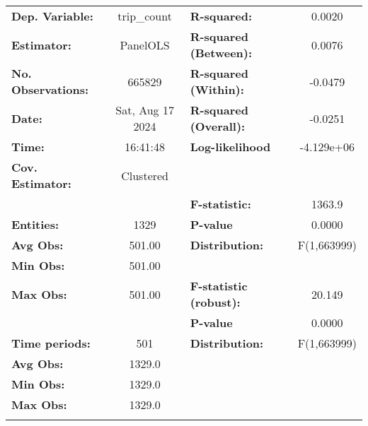 \begin{center}
\begin{tabular}{lclc}
\toprule
\textbf{Dep. Variable:}    &    trip\_count     & \textbf{  R-squared:         }   &      0.0020      \\
\textbf{Estimator:}        &      PanelOLS      & \textbf{  R-squared (Between):}  &      0.0076      \\
\textbf{No. Observations:} &       665829       & \textbf{  R-squared (Within):}   &     -0.0479      \\
\textbf{Date:}             &  Sat, Aug 17 2024  & \textbf{  R-squared (Overall):}  &     -0.0251      \\
\textbf{Time:}             &      16:41:48      & \textbf{  Log-likelihood     }   &    -4.129e+06    \\
\textbf{Cov. Estimator:}   &     Clustered      & \textbf{                     }   &                  \\
\textbf{}                  &                    & \textbf{  F-statistic:       }   &      1363.9      \\
\textbf{Entities:}         &        1329        & \textbf{  P-value            }   &      0.0000      \\
\textbf{Avg Obs:}          &       501.00       & \textbf{  Distribution:      }   &   F(1,663999)    \\
\textbf{Min Obs:}          &       501.00       & \textbf{                     }   &                  \\
\textbf{Max Obs:}          &       501.00       & \textbf{  F-statistic (robust):} &      20.149      \\
\textbf{}                  &                    & \textbf{  P-value            }   &      0.0000      \\
\textbf{Time periods:}     &        501         & \textbf{  Distribution:      }   &   F(1,663999)    \\
\textbf{Avg Obs:}          &       1329.0       & \textbf{                     }   &                  \\
\textbf{Min Obs:}          &       1329.0       & \textbf{                     }   &                  \\
\textbf{Max Obs:}          &       1329.0       & \textbf{                     }   &                  \\
\textbf{}                  &                    & \textbf{                     }   &                  \\
\bottomrule

\end{tabular}
\end{center}
